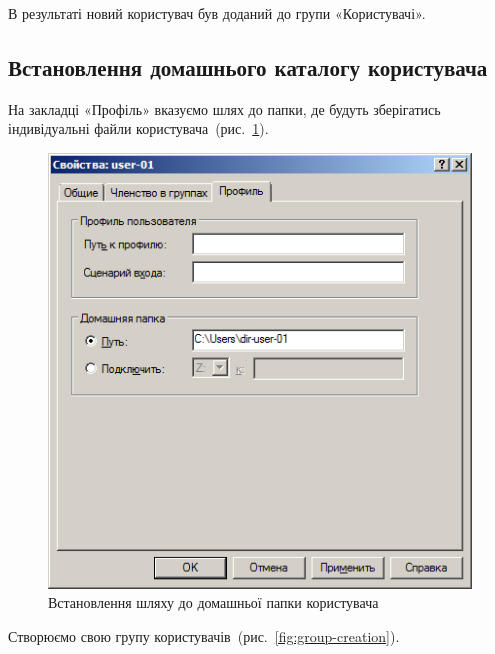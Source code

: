 \documentclass[
	a4paper,
	oneside,
	DIV = 12,
	fontsize = 13pt,
	headings = normal,
]{scrartcl}
\begin{document}
			В результаті новий користувач був доданий до групи «Користувачі».

		\subsection{Встановлення домашнього каталогу користувача}
			На закладці «Профіль» вказуємо шлях до папки, де будуть зберігатись індивідуальні файли користувача~(рис.~\ref{fig:home-folder}). 
			
			\begin{figure}[!htbp]
				\centering
				\includegraphics[height = 11.5\baselineskip]{../01-solution/y03s01-pcdiag-lab-08-p05.png}
				\caption{Встановлення шляху до домашньої папки користувача}
				\label{fig:home-folder}
			\end{figure}
			
			Створюємо свою групу користувачів~(рис.~\ref{fig:group-creation}).
\end{document}
